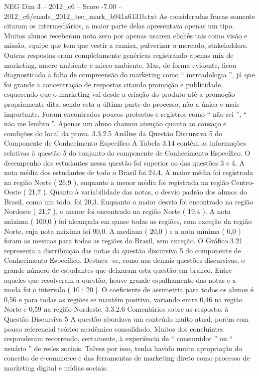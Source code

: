 \begin{textsample}{NEG Dim 3 – 2012\_c6 – Score -7.00 – 2012\_c6/enade\_2012\_tec\_mark\_b941a6131b.txt}
As consideradas fracas somente citaram os intermediários, a maior parte delas apresentava apenas um tipo.
Muitos alunos receberam nota zero por apenas usarem clichês tais como visão e missão, equipe que tem que vestir a camisa, pulverizar o mercado, stakeholders.
Outras respostas eram completamente genéricas registrando apenas mix de marketing, macro ambiente e micro ambiente.
Mas, de forma evidente, ficou diagnosticada a falta de compreensão do marketing como “ mercadologia ”, já que foi grande a concentração de respostas citando promoção e publicidade, esquecendo que o marketing vai desde a criação do produto até a promoção propriamente dita, sendo esta a última parte do processo, não a única e mais importante.
Foram encontrados poucos protestos e registros como “ não sei ”, “ não me lembro ”.
Apenas um aluno chamou atenção quanto ao cansaço e condições do local da prova. 3.3.2.5 Análise da Questão Discursiva 5 do Componente de Conhecimento Específico A Tabela 3.14 contém as informações relativas à questão 5 do conjunto do componente de Conhecimento Específico.
O desempenho dos estudantes nessa questão foi superior ao das questões 3 e 4.
A nota média dos estudantes de todo o Brasil foi 24,4.
A maior média foi registrada na região Norte ( 26,9 ), enquanto a menor média foi registrada na região Centro-Oeste ( 21,7 ).
Quanto à variabilidade das notas, o desvio padrão dos alunos do Brasil, como um todo, foi 20,3.
Enquanto o maior desvio foi encontrado na região Nordeste ( 21,7 ), o menor foi encontrado na região Norte ( 19,4 ).
A nota máxima ( 100,0 ) foi alcançada em quase todas as regiões, com exceção da região Norte, cuja nota máxima foi 90,0.
A mediana ( 20,0 ) e a nota mínima ( 0,0 ) foram as mesmas para todas as regiões do Brasil, sem exceção.
O Gráfico 3.21 representa a distribuição das notas da questão discursiva 5 do componente de Conhecimento Específico.
Destaca -se, como nas demais questões discursivas, o grande número de estudantes que deixaram esta questão em branco.
Entre aqueles que resolveram a questão, houve grande espalhamento das notas e a moda foi o intervalo ( 10 ; 20 ].
O coeficiente de assimetria para todos os alunos é 0,56 e para todas as regiões se mantém positivo, variando entre 0,46 na região Norte e 0,59 na região Nordeste. 3.3.2.6 Comentários sobre as respostas à Questão Discursiva 5 A questão abordava um conteúdo muito atual, porém com pouco referencial teórico acadêmico consolidado.
Muitos dos concluintes responderam recorrendo, certamente, à experiência de “ consumidor ” ou “ usuário ” de redes sociais.
Talvez por isso, tenha havido muita apropriação do conceito de e-commerce e das ferramentas de marketing direto como processo de marketing digital e mídias sociais.

\end{textsample}
